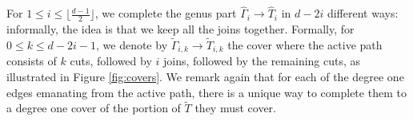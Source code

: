 \documentclass[11pt,reqno]{amsart}
\theoremstyle{definition}
\newcommand{\gGamma}{\widehat{\Gamma}}
\newcommand{\gT}{\widehat{T}}
\begin{document}
For $1\leq i\leq \lfloor \frac{d-1}{2} \rfloor$, we complete the genus part $\gGamma_i\to \gT_i$ in $d-2i$ different ways: informally, the idea is that we keep all the joins together. 
Formally, for $0\leq k\leq d-2i-1$, we denote by $\tilde{\Gamma}_{i,k}
\to \tilde{T}_{i,k}$ the cover where the active path consists of $k$ cuts, followed by $i$ joins, followed by the remaining cuts, as illustrated in Figure \ref{fig:covers}. We remark again that for each of the degree one edges emanating from the active path, there is a unique way to complete them to a degree one cover of the portion of $\tilde{T}$ they must cover.








\end{document}
